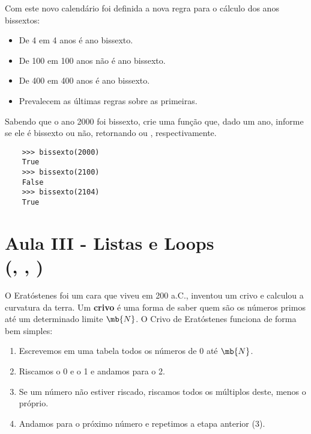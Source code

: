         Com este novo calendário foi definida a nova regra para o cálculo dos anos bissextos:
        
        \begin{itemize}
            \item De 4 em 4 anos é ano bissexto.
            \item De 100 em 100 anos não é ano bissexto.
            \item De 400 em 400 anos é ano bissexto.
            \item Prevalecem as últimas regras sobre as primeiras.
        \end{itemize}
        
        \quest Sabendo que o ano 2000 foi bissexto, crie uma função que, dado um ano, informe se ele é bissexto ou não, retornando  ou , respectivamente.\\
        
        \example
        \begin{lstlisting}
    >>> bissexto(2000)
    True
    >>> bissexto(2100)
    False
    >>> bissexto(2104)
    True
        \end{lstlisting}
        
        \pagebreak
        
        
        
        \pagebreak
        
        \section{Aula III - Listas e Loops \\(, , )}
        
        
        \pagebreak
        
        
        O Eratóstenes foi um cara que viveu em 200 a.C., inventou um crivo e calculou a curvatura da terra.
        Um \textbf{crivo} é uma forma de saber quem são os números primos até um determinado limite $\mb{N}$. O Crivo de Eratóstenes funciona de forma bem simples:
        
        \begin{enumerate}
            \item Escrevemos em uma tabela todos os números de 0 até $\mb{N}$.
    
            \item Riscamos o 0 e o 1 e andamos para o 2.
    
            \item Se um número não estiver riscado, riscamos todos os múltiplos deste, menos o próprio.
            
            \item Andamos para o próximo número e repetimos a etapa anterior (3).		
        \end{enumerate}
        

